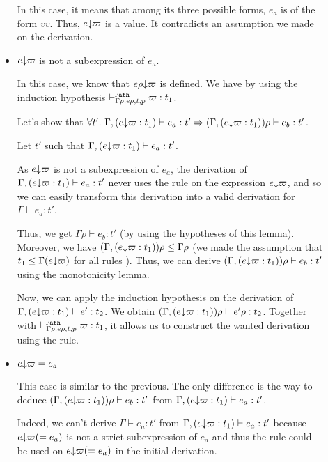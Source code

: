 \documentclass[a4paper]{article}
\theoremstyle{definition}
\begin{document}
\begin{description}
\begin{itemize}
            In this case, it means that among its three possible forms,
            $e_a$ is of the form $v v$. Thus, $\occ e \varpi$ is a value.
            It contradicts an assumption we made on the derivation.

            \item $\occ e \varpi$ is not a subexpression of $e_a$.
            
            In this case, we know that $\occ {e\rho} \varpi$ is defined.
            We have by using the induction hypothesis $\pvdash {\Gamma\rho} p {e\rho} t \varpi:t_1$.

            Let's show that $\forall t'.\ \Gamma,(\occ e \varpi:t_1) \vdash e_a : t' \Rightarrow (\Gamma,(\occ e \varpi:t_1))\rho \vdash e_b:t'$.
            
            Let $t'$ such that $\Gamma,(\occ e \varpi:t_1) \vdash e_a : t'$.

            As $\occ e \varpi$ is not a subexpression of $e_a$, the derivation of
            $\Gamma,(\occ e \varpi:t_1) \vdash e_a : t'$ never uses the rule  on the expression $\occ e \varpi$,
            and so we can easily transform this derivation into a valid derivation for $\Gamma \vdash e_a : t'$.
 
            Thus, we get $\Gamma\rho \vdash e_b : t'$ (by using the hypotheses of this lemma).
            Moreover, we have $(\Gamma,(\occ e \varpi:t_1))\rho \leq \Gamma\rho$
            (we made the assumption that $t_1 \leq \Gamma(\occ e \varpi)$ for all rules ).
            Thus, we can derive $(\Gamma,(\occ e \varpi:t_1))\rho\vdash e_b : t'$ using the monotonicity lemma.

            Now, we can apply the induction hypothesis on the derivation of $\Gamma,(\occ e \varpi:t_1) \vdash e' : t_2$.
            We obtain $(\Gamma,(\occ e \varpi:t_1))\rho \vdash e'\rho : t_2$.
            Together with $\pvdash {\Gamma\rho} p {e\rho} t \varpi:t_1$, it allows us to construct the wanted derivation using the
             rule.

            \item $\occ e \varpi = e_a$
            
            This case is similar to the previous.
            The only difference is the way to deduce $(\Gamma,(\occ e \varpi:t_1))\rho \vdash e_b:t'$ from $\Gamma,(\occ e \varpi:t_1) \vdash e_a : t'$.

            Indeed, we can't derive $\Gamma \vdash e_a : t'$ from $\Gamma,(\occ e \varpi:t_1) \vdash e_a : t'$ because $\occ e \varpi (= e_a)$
            is not a strict subexpression of $e_a$ and thus the rule  could be used on $\occ e \varpi (= e_a)$ in the initial derivation.


\end{itemize}
\end{description}
\end{document}
